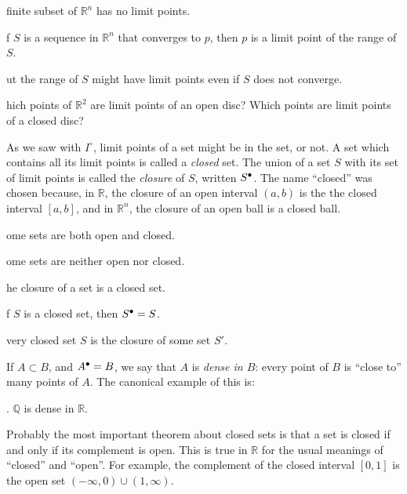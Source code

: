 \documentclass{article}
\def\R{{\mathbb R}}
\def\Rn{{\R^n}}
\newcounter{exercisecounter}\setcounter{exercisecounter}{1}
\def\Exercise.#1\par{{\item\small \makebox{\bf Exercise \number\theexercisecounter.\hspace{0.5em}}\unskip\ignorespaces#1\addtocounter{exercisecounter}{1}}}
\def\clos#1{\smash{#1}^\bullet\vphantom{#1}}
\begin{document}
\begin{itemize}
\Exercise. A finite subset of $\R^n$ has no limit points.


\Exercise. If $S$ is a sequence in $\Rn$ that converges to $p$, then $p$
is a limit point of the range of $S$.

\Exercise. But the range of $S$ might have limit points even if $S$ does not converge.

\Exercise. Which points of $\R^2$ are limit points of an open disc?
Which points are limit points of a closed disc?

\end{itemize}

As we saw with $I^\circ$, limit points of a set might be in the set,
or not.  A set which contains all its limit points is called a {\em
  closed\/} set.  The union of a set $S$ with its set of limit points
is called the {\em closure\/} of $S$, written $\clos S$.  The name
``closed'' was chosen because, in $\R$, the closure of an open interval
$(a, b)$ is the the closed interval $[a, b]$, and in $\Rn$, the closure of
an open ball is a closed ball.

\begin{itemize}
\Exercise. Some sets are both open and closed.

\Exercise. Some sets are neither open nor closed.

\Exercise. The closure of a set is a closed set.

\Exercise. If $S$ is a closed set, then $\clos S = S$.

\Exercise. Every closed set $S$ is the closure of some set $S'$. 

\end{itemize}

If $A\subset B$, and $\clos A = B$, we say that
$A$ is {\em dense in $B$}: every point of $B$ is ``close to'' many
points of  $A$.  The canonical example of this is:

\begin{itemize}
\Exercise. $\mathbb Q$ is dense in $\R$.

\end{itemize}

Probably the most important theorem about closed sets is that a set is
closed if and only if its complement is open.    This is
true in $\R$ for the usual meanings of ``closed'' and ``open''.  For
example, the complement of the closed interval $[0, 1]$ is the open
set $(-\infty, 0) \cup (1, \infty)$.
\end{document}
